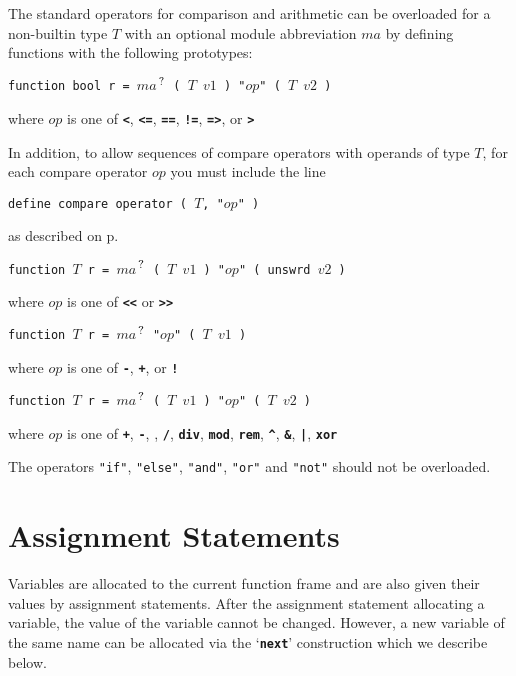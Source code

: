 \documentclass[12pt]{article}
\newcommand{\TT}[1]{{\tt \bfseries #1}}
\newcommand{\pagref}[1]{p\pageref{#1}}
\newcommand{\QMARK}{{$^{\,\mbox{\footnotesize ?}}$}}
\newenvironment{indpar}[1][0.3in]%
	{\begin{list}{}%
		     {\setlength{\itemsep}{0in}%
		      \setlength{\topsep}{0in}%
		      \setlength{\parsep}{1ex}%
		      \setlength{\labelwidth}{#1}%
		      \setlength{\leftmargin}{#1}%
		      \addtolength{\leftmargin}{\labelsep}}%
	 \item}%
	{\end{list}}
\begin{document}
The standard operators for comparison and arithmetic can be overloaded
for a non-builtin type $T$ with an optional module abbreviation
$ma$ by defining functions with the following prototypes:
\begin{indpar}
{\tt function bool r = $ma$\QMARK{} ( $T$ $v1$ ) "$op$" ( $T$ $v2$ )}
\begin{indpar}
where $op$ is one of \TT{<}, \TT{<=}, \TT{==}, \TT{!=}, \TT{=>}, or \TT{>}

In addition, to allow sequences of compare operators with operands
of type $T$, for each compare operator $op$ you must include the line
\begin{center}
\tt define compare operator ( $T$, "$op$" )
\end{center}
as described on \pagref{DEFINE-COMPARE-OPERATOR}.
\end{indpar}

{\tt function $T$ r = $ma$\QMARK{} ( $T$ $v1$ ) "$op$" ( unswrd $v2$ )}
\begin{indpar}
where $op$ is one of \TT{<{}<} or \TT{>{}>}
\end{indpar}

{\tt function $T$ r = $ma$\QMARK{} "$op$" ( $T$ $v1$ )}
\begin{indpar}
where $op$ is one of \TT{-}, \TT{+}, or \TT{!}
\end{indpar}

{\tt function $T$ r = $ma$\QMARK{} ( $T$ $v1$ ) "$op$" ( $T$ $v2$ )}
\begin{indpar}
where $op$ is one of
    \TT{+}, \TT{-},
    \TT{*}, \TT{/}, \TT{div}, \TT{mod}, \TT{rem}, \TT{\textasciicircum},
    \TT{\&}, \TT{|}, \TT{xor}
\end{indpar}

\end{indpar}


The operators {\tt "if"}, {\tt "else"}, {\tt "and"},
{\tt "or"} and {\tt "not"} should not be overloaded.

\section{Assignment Statements}
\label{ASSIGNMENT-STATEMENTS}

Variables are allocated to the current function frame
and are also given their values by assignment statements.
After the assignment statement allocating a variable,
the value of the variable cannot be changed.  However,
a new variable of the same name can be allocated via
the `\TT{next}' construction which we describe below.
\end{document}

